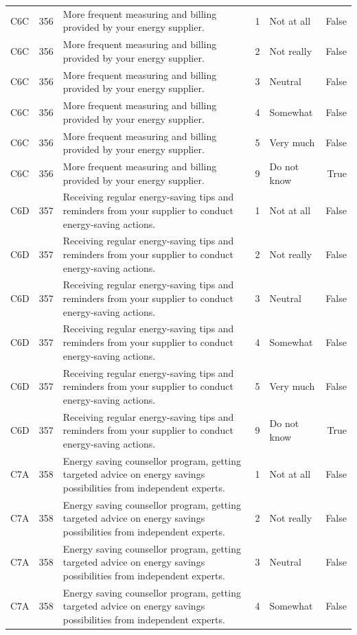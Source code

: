 \begin{tabular}{lrlllr}
C6C & 356 & More frequent measuring and billing provided by your energy supplier. & 1 & Not at all & False \\
C6C & 356 & More frequent measuring and billing provided by your energy supplier. & 2 & Not really & False \\
C6C & 356 & More frequent measuring and billing provided by your energy supplier. & 3 & Neutral & False \\
C6C & 356 & More frequent measuring and billing provided by your energy supplier. & 4 & Somewhat & False \\
C6C & 356 & More frequent measuring and billing provided by your energy supplier. & 5 & Very much & False \\
C6C & 356 & More frequent measuring and billing provided by your energy supplier. & 9 & Do not know & True \\
C6D & 357 & Receiving regular energy-saving tips and reminders from your supplier to conduct energy-saving actions. & 1 & Not at all & False \\
C6D & 357 & Receiving regular energy-saving tips and reminders from your supplier to conduct energy-saving actions. & 2 & Not really & False \\
C6D & 357 & Receiving regular energy-saving tips and reminders from your supplier to conduct energy-saving actions. & 3 & Neutral & False \\
C6D & 357 & Receiving regular energy-saving tips and reminders from your supplier to conduct energy-saving actions. & 4 & Somewhat & False \\
C6D & 357 & Receiving regular energy-saving tips and reminders from your supplier to conduct energy-saving actions. & 5 & Very much & False \\
C6D & 357 & Receiving regular energy-saving tips and reminders from your supplier to conduct energy-saving actions. & 9 & Do not know & True \\
C7A & 358 & Energy saving counsellor program, getting targeted advice on energy savings possibilities from independent experts. & 1 & Not at all & False \\
C7A & 358 & Energy saving counsellor program, getting targeted advice on energy savings possibilities from independent experts. & 2 & Not really & False \\
C7A & 358 & Energy saving counsellor program, getting targeted advice on energy savings possibilities from independent experts. & 3 & Neutral & False \\
C7A & 358 & Energy saving counsellor program, getting targeted advice on energy savings possibilities from independent experts. & 4 & Somewhat & False \\

\end{tabular}
